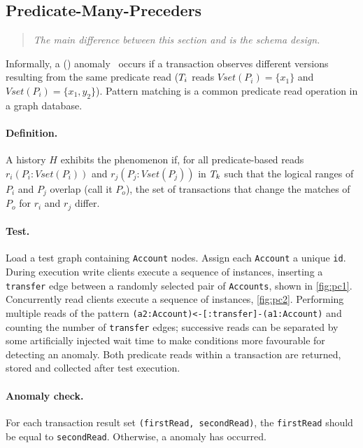 \subsection*{Predicate-Many-Preceders}

\begin{quote}
  \textit{The main difference between this section and \ldbcsnb\xspace
          is the schema design.
  }
\end{quote}

Informally, a  () 
anomaly~\cite{DBLP:journals/pvldb/BailisDFGHS13} occurs if a transaction observes 
different versions resulting from the same predicate read
(\eg $T_i$ reads
$\textit{Vset}(P_i) =  \{x_1\}$ and
$\textit{Vset}(P_i) = \{x_1,y_2\}$).
Pattern matching is a common predicate read operation in a graph database.

\paragraph{Definition.}
A history $H$ exhibits the phenomenon  if, for all predicate-based reads $r_i(P_i : \textit{Vset}(P_i))$ and $r_j(P_j : \textit{Vset}(P_j))$ in $T_k$ such that the logical ranges of $P_i$ and $P_j$ overlap (call it $P_o$), the set of transactions that change the matches of $P_o$ for $r_i$ and $r_j$ differ.

\paragraph{Test.}
Load a test graph containing \texttt{Account} nodes. Assign each \texttt{Account} 
a unique \texttt{id}. During execution write clients execute a sequence of 
 instances, inserting a \texttt{transfer} edge between a 
randomly selected pair of \texttt{Accounts}, shown in \autoref{fig:pc1}. 
Concurrently read clients execute a sequence of  
instances, \autoref{fig:pc2}. Performing multiple reads of the pattern 
\texttt{(a2:Account)<-[:transfer]-(a1:Account)} and counting the number of 
\texttt{transfer} edges; successive reads can be separated by some artificially 
injected wait time to make conditions more favourable for detecting an anomaly.
Both predicate reads within a  transaction are returned, 
stored and collected after test execution.

\paragraph{Anomaly check.}
For each  transaction result set 
\texttt{(firstRead, secondRead)}, the \texttt{firstRead} should be equal to 
\texttt{secondRead}. Otherwise, a  anomaly has occurred.

